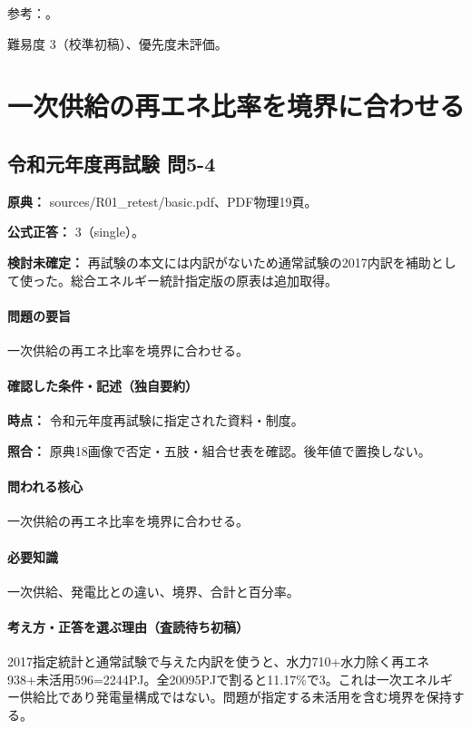 \par 参考：\cite{env59_plastic}。

\par 難易度 3（校準初稿）、優先度未評価。

\section{一次供給の再エネ比率を境界に合わせる}

\subsection{令和元年度再試験 問5-4}
\label{q:r01-ret-basic-5-4}

\noindent\textbf{原典：} sources/R01\_retest/basic.pdf、PDF物理19頁。

\textbf{公式正答：} 3（single）。

\par\textbf{検討未確定：} 再試験の本文には内訳がないため通常試験の2017内訳を補助として使った。総合エネルギー統計指定版の原表は追加取得。

\paragraph{問題の要旨} 一次供給の再エネ比率を境界に合わせる。

\paragraph{確認した条件・記述（独自要約）}\mbox{}\par

\noindent\textbf{時点：} 令和元年度再試験に指定された資料・制度。\par

\noindent\textbf{照合：} 原典18画像で否定・五肢・組合せ表を確認。後年値で置換しない。\par

\paragraph{問われる核心} 一次供給の再エネ比率を境界に合わせる。

\paragraph{必要知識} 一次供給、発電比との違い、境界、合計と百分率。

\paragraph{考え方・正答を選ぶ理由（査読待ち初稿）} 2017指定統計と通常試験で与えた内訳を使うと、水力710+水力除く再エネ938+未活用596=\allowbreak{}2244PJ。全20095PJで割ると11.17\%で3。これは一次エネルギー供給比であり発電量構成ではない。問題が指定する未活用を含む境界を保持する。

